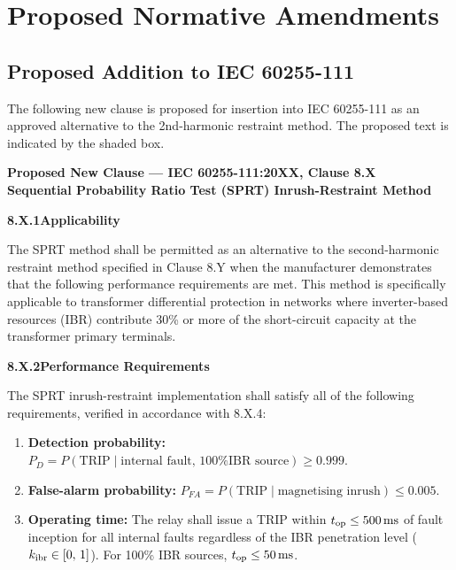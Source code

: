 \documentclass[11pt, a4paper]{article}
\newcommand{\ms}{\,\text{ms}}
\begin{document}
\section{Proposed Normative Amendments}

\subsection{Proposed Addition to IEC 60255-111}

The following new clause is proposed for insertion into IEC 60255-111 as
an approved alternative to the 2nd-harmonic restraint method.  The proposed
text is indicated by the shaded box.

\begin{propbox}
  \textbf{Proposed New Clause --- IEC 60255-111:20XX, Clause 8.X}\\
  \textbf{Sequential Probability Ratio Test (SPRT) Inrush-Restraint Method}

  \medskip
  \textbf{8.X.1\quad Applicability}

  The SPRT method shall be permitted as an alternative to the second-harmonic
  restraint method specified in Clause 8.Y when the manufacturer demonstrates
  that the following performance requirements are met.  This method is
  specifically applicable to transformer differential protection in networks
  where inverter-based resources (IBR) contribute 30\% or more of the
  short-circuit capacity at the transformer primary terminals.

  \medskip
  \textbf{8.X.2\quad Performance Requirements}

  The SPRT inrush-restraint implementation shall satisfy all of the following
  requirements, verified in accordance with 8.X.4:

  \begin{enumerate}[label=(\roman*)]
    \item \textbf{Detection probability:}
      $P_D = P(\text{TRIP} \mid \text{internal fault, 100\% IBR source}) \geq 0.999$.

    \item \textbf{False-alarm probability:}
      $P_{FA} = P(\text{TRIP} \mid \text{magnetising inrush}) \leq 0.005$.

    \item \textbf{Operating time:}
      The relay shall issue a TRIP within $t_{\rm op} \leq 500\ms$ of fault
      inception for all internal faults regardless of the IBR penetration level
      ($k_{\rm ibr} \in [0,\,1]$).  For 100\% IBR sources, $t_{\rm op} \leq
      50\ms$.


\end{enumerate}
\end{propbox}
\end{document}
